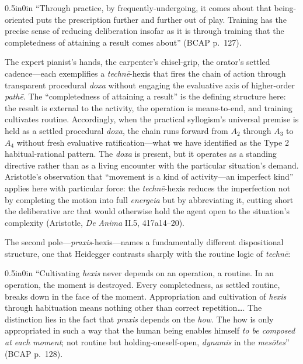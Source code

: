\documentclass{article}
\begin{document}
\begin{adjustwidth}{0.5in}{0in}
``Through practice, by frequently-undergoing, it comes about that being-oriented puts the prescription further and further out of play. Training has the precise sense of reducing deliberation insofar as it is through training that the completedness of attaining a result comes about'' (BCAP p.~127).
\end{adjustwidth}

The expert pianist's hands, the carpenter's chisel-grip, the orator's settled cadence---each exemplifies a \textit{techn\=e}-hexis that fires the chain of action through transparent procedural \textit{doxa} without engaging the evaluative axis of higher-order \textit{path\=e}. The ``completedness of attaining a result'' is the defining structure here: the result is external to the activity, the operation is means-to-end, and training cultivates routine. Accordingly, when the practical syllogism's universal premise is held as a settled procedural \textit{doxa}, the chain runs forward from $A_2$ through $A_3$ to $A_4$ without fresh evaluative ratification---what we have identified as the Type 2 habitual-rational pattern. The \textit{doxa} is present, but it operates as a standing directive rather than as a living encounter with the particular situation's demand. Aristotle's observation that ``movement is a kind of activity---an imperfect kind'' applies here with particular force: the \textit{techn\=e}-hexis reduces the imperfection not by completing the motion into full \textit{energeia} but by abbreviating it, cutting short the deliberative arc that would otherwise hold the agent open to the situation's complexity (Aristotle, \textit{De Anima} II.5, 417a14--20).

The second pole---\textit{praxis}-hexis---names a fundamentally different dispositional structure, one that Heidegger contrasts sharply with the routine logic of \textit{techn\=e}:

\begin{adjustwidth}{0.5in}{0in}
``Cultivating \textit{hexis} never depends on an operation, a routine. In an operation, the moment is destroyed. Every completedness, as settled routine, breaks down in the face of the moment. Appropriation and cultivation of \textit{hexis} through habituation means nothing other than correct repetition\ldots. The distinction lies in the fact that \textit{praxis} depends on the \textit{how}. The how is only appropriated in such a way that the human being enables himself \textit{to be composed at each moment}; not routine but holding-oneself-open, \textit{dynamis} in the \textit{mes\=otes}'' (BCAP p.~128).
\end{adjustwidth}
\end{document}
